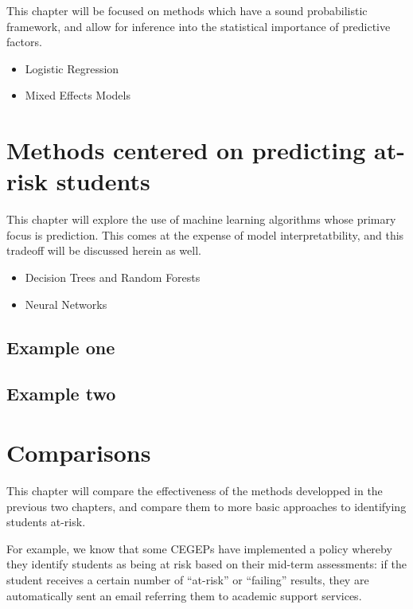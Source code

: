 \documentclass[]{book}
\providecommand{\tightlist}{%
  \setlength{\itemsep}{0pt}\setlength{\parskip}{0pt}}
\theoremstyle{definition}
\theoremstyle{definition}
\theoremstyle{remark}
\begin{document}
This chapter will be focused on methods which have a sound probabilistic
framework, and allow for inference into the statistical importance of
predictive factors.

\begin{itemize}
\tightlist
\item
  Logistic Regression
\item
  Mixed Effects Models
\end{itemize}

\chapter{Methods centered on predicting at-risk
students}\label{methods-centered-on-predicting-at-risk-students}

This chapter will explore the use of machine learning algorithms whose
primary focus is prediction. This comes at the expense of model
interpretatbility, and this tradeoff will be discussed herein as well.

\begin{itemize}
\tightlist
\item
  Decision Trees and Random Forests
\item
  Neural Networks
\end{itemize}

\section{Example one}\label{example-one}

\section{Example two}\label{example-two}

\chapter{Comparisons}\label{comparisons}

This chapter will compare the effectiveness of the methods developped in
the previous two chapters, and compare them to more basic approaches to
identifying students at-risk.

For example, we know that some CEGEPs have implemented a policy whereby
they identify students as being at risk based on their mid-term
assessments: if the student receives a certain number of ``at-risk'' or
``failing'' results, they are automatically sent an email referring them
to academic support services.
\end{document}
